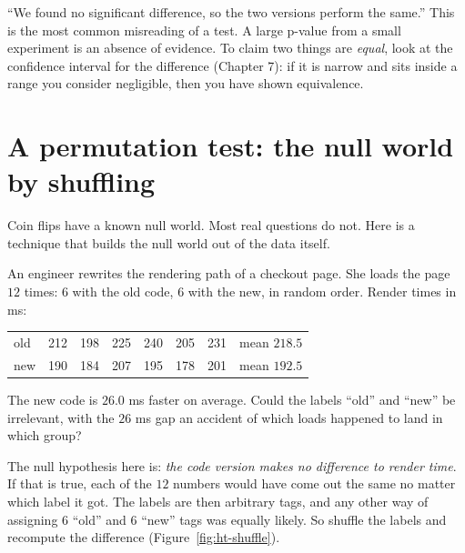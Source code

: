 \begin{trapbox}
``We found no significant difference, so the two versions perform the same.'' This is
the most common misreading of a test. A large p-value from a small experiment is
an absence of evidence. To claim two things are \emph{equal}, look at the
confidence interval for the difference (Chapter 7): if it is narrow and sits inside a
range you consider negligible, then you have shown equivalence.
\end{trapbox}

\section{A permutation test: the null world by shuffling}
\label{sec:ht-permutation}

Coin flips have a known null world. Most real questions do not. Here is a
technique that builds the null world out of the data itself.

An engineer rewrites the rendering path of a checkout page. She loads the page $12$
times: $6$ with the old code, $6$ with the new, in random order. Render times in ms:
\begin{center}
\begin{tabular}{lcccccc|c}
\toprule
old & 212 & 198 & 225 & 240 & 205 & 231 & mean $218.5$\\
new & 190 & 184 & 207 & 195 & 178 & 201 & mean $192.5$\\
\bottomrule
\end{tabular}
\end{center}
The new code is $26.0$ ms faster on average. Could the labels ``old'' and ``new'' be
irrelevant, with the $26$ ms gap an accident of which loads happened to land in which
group?

The null hypothesis here is: \emph{the code version makes no difference to render
time}. If that is true, each of the $12$ numbers would have come out the same no
matter which label it got. The labels are then arbitrary tags, and any other way of
assigning $6$ ``old'' and $6$ ``new'' tags was equally likely. So shuffle the labels
and recompute the difference (Figure~\ref{fig:ht-shuffle}).

